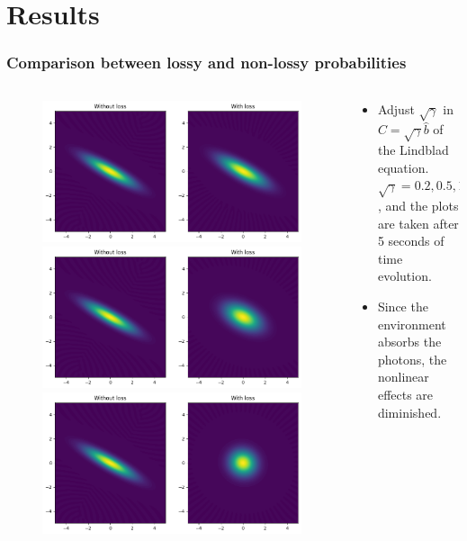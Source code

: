 \documentclass{beamer}
\begin{document}
\section{Results}
\begin{frame}[c]
  \frametitle{Comparison between lossy and non-lossy probabilities}
  \begin{columns}
    \begin{column}{0.5\linewidth}
      \begin{figure}
        \includegraphics[width=0.7\linewidth]{squeezed_decay_0.2.png}
        \includegraphics[width=0.7\linewidth]{squeezed_decay_0.5.png}
        \includegraphics[width=0.7\linewidth]{squeezed_decay_1.0.png}
      \end{figure}
    \end{column}
    \begin{column}{0.5\linewidth}
      \begin{itemize}
        \item Adjust $\sqrt{\gamma}$ in $C=\sqrt{\gamma}\hat{b}$ of the Lindblad equation. $\sqrt{\gamma}=0.2,0.5,1.0$, and the plots are taken after 5 seconds of time evolution.
        \item Since the environment absorbs the photons, the nonlinear effects are diminished.
      \end{itemize}
    \end{column}
  \end{columns}
\end{frame}
\end{document}
